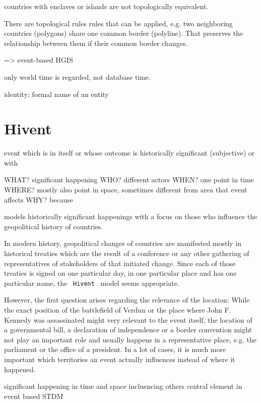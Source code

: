 countries with enclaves or islands are not topologically equivalent.

There are topological rules rules that can be applied, e.g. two neighboring countries (polygons) share one common border (polyline). That preserves the relationship between them if their common border changes.

=> event-based HGIS

only world time is regarded, not database time.

identity: formal name of an entity


\section{Hivent} %
\label{sec:hivent}

event which is in itself or whose outcome is historically significant (subjective) or with

  WHAT? significant happening
  WHO? different actors
  WHEN? one point in time
  WHERE? mostly also point in space, sometimes different from area that event affects
  WHY? because

models historically significant happenings with a focus on those who influence the geopolitical history of countries.

In modern history, geopolitical changes of countries are manifested mostly in historical treaties which are the result of a conference or any other gathering of representatives of stakeholders of that initiated change. Since each of those treaties is signed on one particular day, in one particular place and has one particular name, the ~\texttt{Hivent}~ model seems appropriate.

However, the first question arises regarding the relevance of the location: While the exact position of the battlefield of Verdun or the place where John F. Kennedy was assassinated might very relevant to the event itself, the location of a governmental bill, a declaration of independence or a border convention might not play an important role and usually happens in a representative place, e.g. the parliament or the office of a president. In a lot of cases, it is much more important which territories an event actually influences instead of where it happened.



significant happening in time and space
incluencing others
central element in event based STDM

